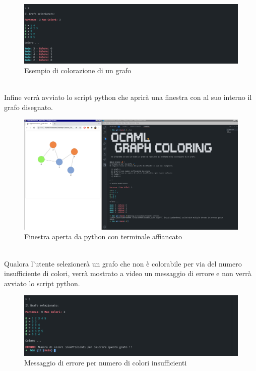 \begin{figure}[H]
	\centering
	\includegraphics[width=\textwidth]{img/grafo1bin.png}
	\caption{Esempio di colorazione di un grafo}
\end{figure}
\ \\
Infine verrà avviato lo script python che aprirà una finestra con al suo interno il grafo disegnato.

\begin{figure}[H]
	\centering
	\includegraphics[width=\textwidth]{img/termgrafo.png}
	\caption{Finestra aperta da python con terminale affiancato}
\end{figure}
\ \\
Qualora l'utente selezionerà un grafo che non è colorabile per via del numero insufficiente di colori, verrà mostrato a video un messaggio di errore e non verrà avviato lo script python.

\begin{figure}[H]
	\centering
	\includegraphics[width=\textwidth]{img/errore.png}
	\caption{Messaggio di errore per numero di colori insufficienti}
\end{figure}